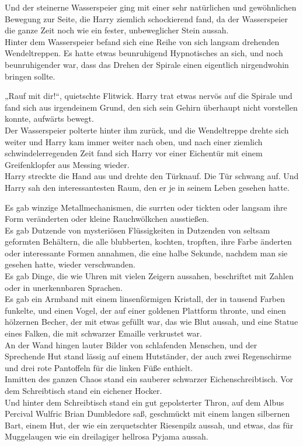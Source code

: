 {Und der steinerne Wasserspeier ging mit einer sehr natürlichen und gewöhnlichen Bewegung zur Seite, die Harry ziemlich schockierend fand, da der Wasserspeier die ganze Zeit noch wie ein fester, unbeweglicher Stein aussah.\\ Hinter dem Wasserspeier befand sich eine Reihe von sich langsam drehenden Wendeltreppen. Es hatte etwas beunruhigend Hypnotisches an sich, und noch beunruhigender war, dass das Drehen der Spirale einen eigentlich nirgendwohin bringen sollte.

„Rauf mit dir!“, quietschte Flitwick. Harry trat etwas nervös auf die Spirale und fand sich aus irgendeinem Grund, den sich sein Gehirn überhaupt nicht vorstellen konnte, aufwärts bewegt.\\ Der Wasserspeier polterte hinter ihm zurück, und die Wendeltreppe drehte sich weiter und Harry kam immer weiter nach oben, und nach einer ziemlich schwindelerregenden Zeit fand sich Harry vor einer Eichentür mit einem Greifenklopfer aus Messing wieder.\\ Harry streckte die Hand aus und drehte den Türknauf. Die Tür schwang auf. Und Harry sah den interessantesten Raum, den er je in seinem Leben gesehen hatte.

Es gab winzige Metallmechanismen, die surrten oder tickten oder langsam ihre Form veränderten oder kleine Rauchwölkchen ausstießen.\\ Es gab Dutzende von mysteriösen Flüssigkeiten in Dutzenden von seltsam geformten Behältern, die alle blubberten, kochten, tropften, ihre Farbe änderten oder interessante Formen annahmen, die eine halbe Sekunde, nachdem man sie gesehen hatte, wieder verschwanden.\\ Es gab Dinge, die wie Uhren mit vielen Zeigern aussahen, beschriftet mit Zahlen oder in unerkennbaren Sprachen.\\ Es gab ein Armband mit einem linsenförmigen Kristall, der in tausend Farben funkelte, und einen Vogel, der auf einer goldenen Plattform thronte, und einen hölzernen Becher, der mit etwas gefüllt war, das wie Blut aussah, und eine Statue eines Falken, die mit schwarzer Emaille verkrustet war.\\ An der Wand hingen lauter Bilder von schlafenden Menschen, und der Sprechende Hut stand lässig auf einem Hutständer, der auch zwei Regenschirme und drei rote Pantoffeln für die linken Füße enthielt.\\ Inmitten des ganzen Chaos stand ein sauberer schwarzer Eichenschreibtisch. Vor dem Schreibtisch stand ein eichener Hocker.\\ Und hinter dem Schreibtisch stand ein gut gepolsterter Thron, auf dem Albus Percival Wulfric Brian Dumbledore saß, geschmückt mit einem langen silbernen Bart, einem Hut, der wie ein zerquetschter Riesenpilz aussah, und etwas, das für Muggelaugen wie ein dreilagiger hellrosa Pyjama aussah.

}
